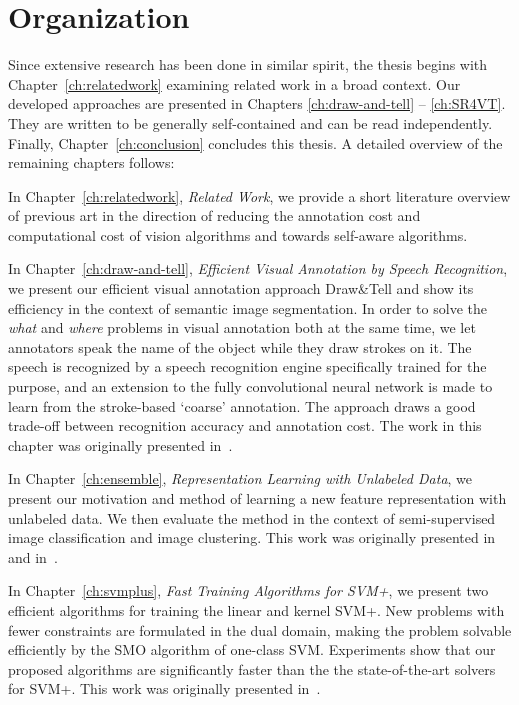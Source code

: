 \section{Organization} 
Since extensive research has been done in similar spirit,  the thesis begins with Chapter~\ref{ch:relatedwork} examining related work in a broad context.   Our developed approaches are presented in Chapters \ref{ch:draw-and-tell} -- \ref{ch:SR4VT}. They are written to be generally self-contained and can be read independently. Finally,  Chapter~\ref{ch:conclusion} concludes this thesis. A detailed overview of the remaining chapters follows:

In Chapter~\ref{ch:relatedwork}, \emph{Related Work}, we provide a short literature overview of previous art in the direction of  reducing the annotation cost and computational cost of vision algorithms and towards self-aware  algorithms. 

In Chapter~\ref{ch:draw-and-tell}, \emph{Efficient Visual Annotation by Speech Recognition}, we present our efficient visual annotation approach Draw\&Tell and show its efficiency in the context of semantic image segmentation. In order to solve the \emph{what} and \emph{where} problems in visual annotation both at the same time, we let annotators speak the name of the object  while they draw strokes on it.  The speech is recognized by a speech recognition engine specifically trained for the purpose, and an extension to the fully convolutional neural network is made to learn from the stroke-based `coarse' annotation.  The approach draws a good trade-off between recognition accuracy and annotation cost. The work in this chapter was originally presented in~\citep{draw:tell}. 

In Chapter~\ref{ch:ensemble}, \emph{Representation Learning with Unlabeled Data}, we present our motivation and method of learning a new feature representation with unlabeled data.  We then evaluate the method in the context of semi-supervised image classification and image clustering.   This work was originally presented in~\citep{dai:eccv12} and in~\citep{dai:iccv13b}. 

In Chapter~\ref{ch:svmplus}, \emph{Fast Training Algorithms for SVM+}, we present two efficient algorithms
  for training the linear and kernel SVM+.  New problems with fewer constraints are formulated in the dual domain, making the problem solvable  efficiently by the SMO algorithm of one-class SVM.  Experiments show that our proposed algorithms are significantly faster than the  the state-of-the-art solvers for SVM+. This work was originally presented in~\citep{fastsvm+2016}. 
 
